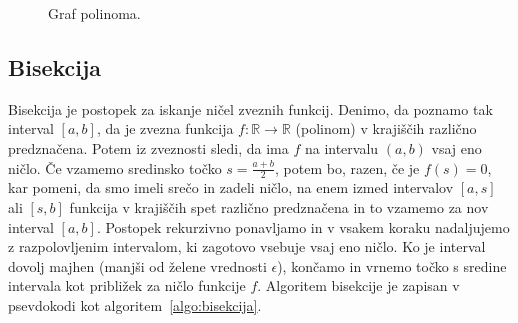 \documentclass[a4paper,oneside,12pt,fleqn]{article}
\def\R{\ensuremath{\mathbb R}}
\newcommand{\beforecaptionskip}{\vspace{-12pt}}
\numberwithin{equation}{section}
\begin{document}
\begin{figure}[ht]
  \begin{center}
  \end{center}
  \beforecaptionskip
  \caption{Graf polinoma.}
  \label{fig:pol:graf}
\end{figure}

\subsection{Bisekcija}
\label{sec:pol:bisekcija}
Bisekcija je postopek za iskanje ničel zveznih funkcij. Denimo, da poznamo tak interval $[a, b]$,
da je zvezna funkcija $f\!: \R \rightarrow \R$ (polinom) v krajiščih različno predznačena.
Potem iz zveznosti sledi, da ima $f$ na intervalu $(a, b)$ vsaj eno ničlo. Če vzamemo sredinsko 
točko $s = \frac{a + b}{2}$, potem bo, razen, če je $f(s) = 0$, kar pomeni, da smo imeli srečo in 
zadeli ničlo, na enem izmed intervalov $[a, s]$ ali $[s, b]$ funkcija v krajiščih spet različno 
predznačena in to vzamemo za nov interval $[a, b]$. Postopek rekurzivno ponavljamo in v vsakem 
koraku nadaljujemo z razpolovljenim intervalom, ki zagotovo vsebuje vsaj eno ničlo. Ko je interval
dovolj majhen (manjši od želene vrednosti $\epsilon$), končamo in vrnemo točko s sredine intervala
kot približek za ničlo funkcije $f$. Algoritem bisekcije je zapisan v psevdokodi kot algoritem~\ref{algo:bisekcija}.
\end{document}
